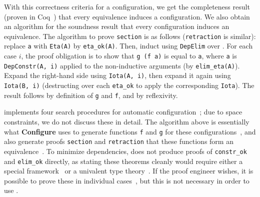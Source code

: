 With this correctness criteria for a configuration, we get the completeness result (proven in Coq~) that every equivalence induces a configuration. %
We also obtain an algorithm for the soundness result that every configuration induces an equivalence.
The algorithm to prove \lstinline{section} is as follows (\lstinline{retraction} is similar):
replace \lstinline{a} with \lstinline{Eta(A)} by \lstinline{eta_ok(A)}.
Then, induct using \lstinline{DepElim} over \A.
For each case $i$, the proof obligation is to show that \lstinline{g (f a)} is equal to \lstinline{a},
where \lstinline{a} is \lstinline{DepConstr(A, i)} applied to the non-inductive arguments (by \lstinline{elim_eta(A)}).
Expand the right-hand side using \lstinline{Iota(A, i)}, then expand it again using \lstinline{Iota(B, i)}
(destructing over each \lstinline{eta_ok} to apply the corresponding \lstinline{Iota}).
The result follows by definition of \lstinline{g} and \lstinline{f}, and by reflexivity.

\toolname implements four search procedures for automatic configuration~;
due to space constraints, we do not discuss these in detail.
The algorithm above is essentially what \textbf{Configure} uses to generate functions \lstinline{f} and \lstinline{g} for these configurations~, %
and also generate proofs \lstinline{section} and \lstinline{retraction} that these functions form an equivalence~. %
To minimize dependencies, \toolname does not produce proofs of \lstinline{constr_ok} and \lstinline{elim_ok} directly,
as stating these theorems cleanly would require either a special framework~\cite{tabareau2017equivalences}
or a univalent type theory~\cite{univalent2013homotopy}.
If the proof engineer wishes, it is possible to prove these in individual cases~, %
but this is not necessary in order to use \toolname. %


